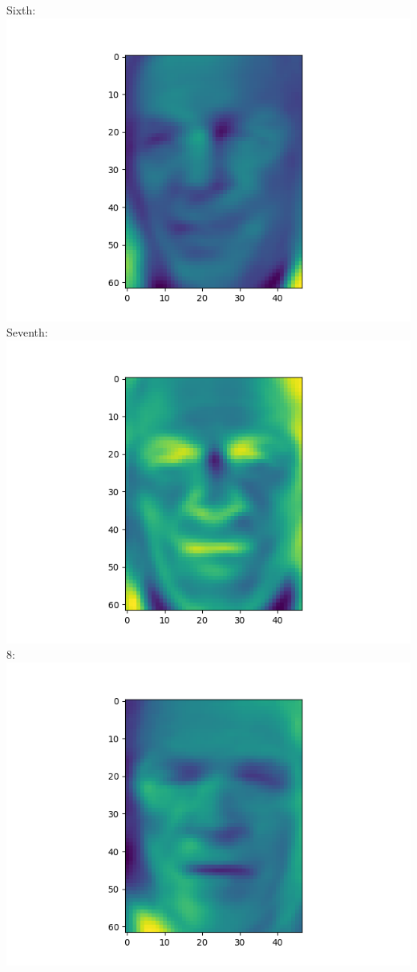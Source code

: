 \documentclass[twoside,10pt]{article}
\theoremstyle{definition}
\theoremstyle{definition}
\theoremstyle{remark}
\renewcommand{\>}{{\rightarrow}}
\newcommand{\1}{{\mathbf 1}}
\newcommand{\0}{{\mathbf 0}}
\begin{document}
\begin{enumerate}
  Sixth:
  \includegraphics[width=\textwidth]{eigenface_6.png}
  Seventh:
  \includegraphics[width=\textwidth]{eigenface_7.png}
  8:
  \includegraphics[width=\textwidth]{eigenface_8.png}

\end{enumerate}
\end{document}
